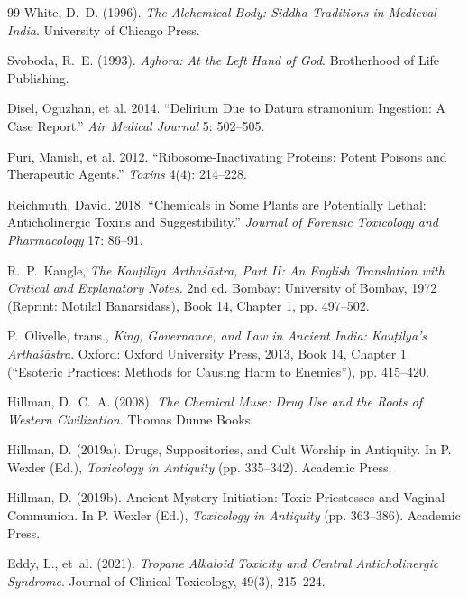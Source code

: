 \documentclass[11pt,twoside,letterpaper]{article}
\begin{document}
\begin{thebibliography}{99}
White, D.~D. (1996).
\newblock \textit{The Alchemical Body: Siddha Traditions in Medieval India}.
\newblock University of Chicago Press.

Svoboda, R.~E. (1993).
\newblock \textit{Aghora: At the Left Hand of God}.
\newblock Brotherhood of Life Publishing.

Disel, Oguzhan, et al. 2014. ``Delirium Due to Datura stramonium Ingestion: 
A Case Report.'' \textit{Air Medical Journal} 5: 502--505.

Puri, Manish, et al. 2012. ``Ribosome-Inactivating Proteins: Potent Poisons 
and Therapeutic Agents.'' \textit{Toxins} 4(4): 214--228.

Reichmuth, David. 2018. ``Chemicals in Some Plants are Potentially Lethal: 
Anticholinergic Toxins and Suggestibility.'' \textit{Journal of Forensic 
Toxicology and Pharmacology} 17: 86--91.

R.~P.~Kangle, \textit{The Kauṭilīya Arthaśāstra, Part II: An English Translation with Critical and Explanatory Notes}. 2nd ed. Bombay: University of Bombay, 1972 (Reprint: Motilal Banarsidass), Book 14, Chapter 1, pp. 497--502.

P.~Olivelle, trans., \textit{King, Governance, and Law in Ancient India: Kauṭilya's Arthaśāstra}. Oxford: Oxford University Press, 2013, Book 14, Chapter 1 (``Esoteric Practices: Methods for Causing Harm to Enemies''), pp. 415--420.

Hillman, D.~C.~A. (2008).
\newblock \textit{The Chemical Muse: Drug Use and the Roots of Western Civilization}.
\newblock Thomas Dunne Books.

Hillman, D. (2019a).
\newblock Drugs, Suppositories, and Cult Worship in Antiquity.
\newblock In P. Wexler (Ed.), \textit{Toxicology in Antiquity} (pp. 335--342). Academic Press.

Hillman, D. (2019b).
\newblock Ancient Mystery Initiation: Toxic Priestesses and Vaginal Communion.
\newblock In P. Wexler (Ed.), \textit{Toxicology in Antiquity} (pp. 363--386). Academic Press.

Eddy, L., et~al. (2021).
\newblock \textit{Tropane Alkaloid Toxicity and Central Anticholinergic Syndrome}.
\newblock Journal of Clinical Toxicology, 49(3), 215--224.


\end{thebibliography}
\end{document}
